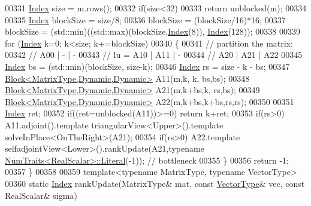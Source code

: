 \begin{DoxyCode}
00331     \hyperlink{group___cholesky___module_ac7a64274814fa76e8b1e9e945546037f}{Index} size = m.rows();
00332     \textcolor{keywordflow}{if}(size<32)
00333       \textcolor{keywordflow}{return} unblocked(m);
00334 
00335     \hyperlink{group___cholesky___module_ac7a64274814fa76e8b1e9e945546037f}{Index} blockSize = size/8;
00336     blockSize = (blockSize/16)*16;
00337     blockSize = (std::min)((std::max)(blockSize,\hyperlink{namespace_eigen_a62e77e0933482dafde8fe197d9a2cfde}{Index}(8)), \hyperlink{namespace_eigen_a62e77e0933482dafde8fe197d9a2cfde}{Index}(128));
00338 
00339     \textcolor{keywordflow}{for} (\hyperlink{group___cholesky___module_ac7a64274814fa76e8b1e9e945546037f}{Index} k=0; k<size; k+=blockSize)
00340     \{
00341       \textcolor{comment}{// partition the matrix:}
00342       \textcolor{comment}{//       A00 |  -  |  -}
00343       \textcolor{comment}{// lu  = A10 | A11 |  -}
00344       \textcolor{comment}{//       A20 | A21 | A22}
00345       \hyperlink{group___cholesky___module_ac7a64274814fa76e8b1e9e945546037f}{Index} bs = (std::min)(blockSize, size-k);
00346       \hyperlink{group___cholesky___module_ac7a64274814fa76e8b1e9e945546037f}{Index} rs = size - k - bs;
00347       \hyperlink{group___core___module_class_eigen_1_1_block}{Block<MatrixType,Dynamic,Dynamic>} A11(m,k,   k,   bs,bs);
00348       \hyperlink{group___core___module_class_eigen_1_1_block}{Block<MatrixType,Dynamic,Dynamic>} A21(m,k+bs,k,   rs,bs);
00349       \hyperlink{group___core___module_class_eigen_1_1_block}{Block<MatrixType,Dynamic,Dynamic>} A22(m,k+bs,k+bs,rs,rs);
00350 
00351       \hyperlink{group___cholesky___module_ac7a64274814fa76e8b1e9e945546037f}{Index} ret;
00352       \textcolor{keywordflow}{if}((ret=unblocked(A11))>=0) \textcolor{keywordflow}{return} k+ret;
00353       \textcolor{keywordflow}{if}(rs>0) A11.adjoint().template triangularView<Upper>().\textcolor{keyword}{template} solveInPlace<OnTheRight>(A21);
00354       \textcolor{keywordflow}{if}(rs>0) A22.template selfadjointView<Lower>().rankUpdate(A21,\textcolor{keyword}{typename} 
      \hyperlink{group___core___module_struct_eigen_1_1_num_traits}{NumTraits<RealScalar>::Literal}(-1)); \textcolor{comment}{// bottleneck}
00355     \}
00356     \textcolor{keywordflow}{return} -1;
00357   \}
00358 
00359   \textcolor{keyword}{template}<\textcolor{keyword}{typename} MatrixType, \textcolor{keyword}{typename} VectorType>
00360   \textcolor{keyword}{static} \hyperlink{group___cholesky___module_ac7a64274814fa76e8b1e9e945546037f}{Index} rankUpdate(MatrixType& mat, \textcolor{keyword}{const} \hyperlink{struct_vector_type}{VectorType}& vec, \textcolor{keyword}{const} RealScalar& sigma)

\end{DoxyCode}

